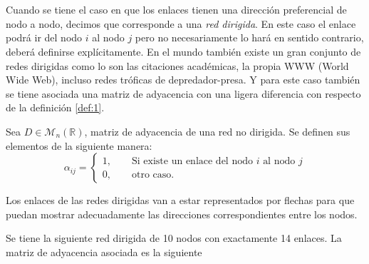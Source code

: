 \\
\\
Cuando se tiene el caso en que los enlaces tienen una dirección preferencial de nodo a nodo, decimos que corresponde a una \textit{red dirigida}. En este caso el enlace podrá ir del nodo $i$ al nodo $j$ pero no necesariamente lo hará en sentido contrario, deberá definirse explícitamente. En el mundo también existe un gran conjunto de redes dirigidas como lo son las citaciones académicas, la propia WWW (World Wide Web), incluso redes tróficas de depredador-presa. Y para este caso también se tiene asociada una matriz de adyacencia con una ligera diferencia con respecto de la definición \ref{def:1}.
\begin{definición}
	Sea $D\in\mathcal{M}_n(\mathbb{R})$, matriz de adyacencia de una red no dirigida. Se definen sus elementos de la siguiente manera:
	$$
	\alpha_{ij}=\begin{cases}
		1,\qquad\text{Si existe un enlace del nodo $i$ al nodo $j$}\\
		0,\qquad\text{otro caso.}
	\end{cases}
	$$
\end{definición}
Los enlaces de las redes dirigidas van a estar representados por flechas para que puedan mostrar adecuadamente las direcciones correspondientes entre los nodos. 
\newpage
\begin{ejemplo}
	Se tiene la siguiente red dirigida de 10 nodos con exactamente 14 enlaces. La matriz de adyacencia asociada es la siguiente
\end{ejemplo}

